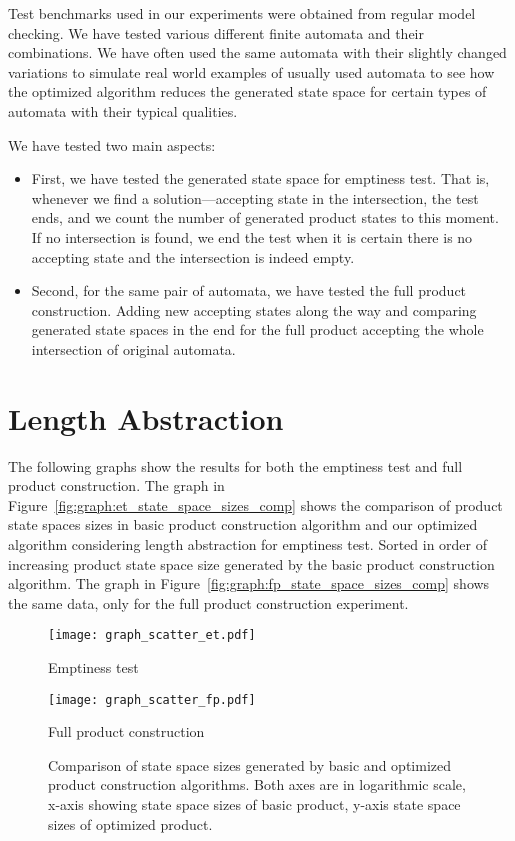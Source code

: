 Test benchmarks used in our experiments were obtained from regular model checking. We have tested various different finite automata and their combinations. We have often used the same automata with their slightly changed variations to simulate real world examples of usually used automata to see how the optimized algorithm reduces the generated state space for certain types of automata with their typical qualities.

We have tested two main aspects:
\begin{itemize}
    \item First, we have tested the generated state space for emptiness test. That is, whenever we find a solution---accepting state in the intersection, the test ends, and we count the number of generated product states to this moment. If no intersection is found, we end the test when it is certain there is no accepting state and the intersection is indeed empty.
    \item Second, for the same pair of automata, we have tested the full product construction. Adding new accepting states along the way and comparing generated state spaces in the end for the full product accepting the whole intersection of original automata.
\end{itemize}

\section{Length Abstraction}

The following graphs show the results for both the emptiness test and full product construction. The graph in Figure~\ref{fig:graph:et_state_space_sizes_comp} shows the comparison of product state spaces sizes in basic product construction algorithm and our optimized algorithm considering length abstraction for emptiness test. Sorted in order of increasing product state space size generated by the basic product construction algorithm. The graph in Figure~\ref{fig:graph:fp_state_space_sizes_comp} shows the same data, only for the full product construction experiment.

\begin{figure*}[ht]
    \centering
    \begin{minipage}{0.49\linewidth}
        \centering
        \texttt{[image: graph\_scatter\_et.pdf]}
        \caption{Emptiness test}
        \label{fig:graph:et_state_space_sizes_comp}
    \end{minipage}
    \hfill
    \begin{minipage}{0.49\linewidth}
        \centering
        \texttt{[image: graph\_scatter\_fp.pdf]}
        \caption{Full product construction}
        \label{fig:graph:fp_state_space_sizes_comp}
    \end{minipage}
    \vspace{0.5cm}
    \caption{Comparison of state space sizes generated by basic and optimized product construction algorithms. Both axes are in logarithmic scale, x-axis showing state space sizes of basic product, y-axis state space sizes of optimized product.}
    \label{fig:graph:product_state_space_sizes}
\end{figure*}

